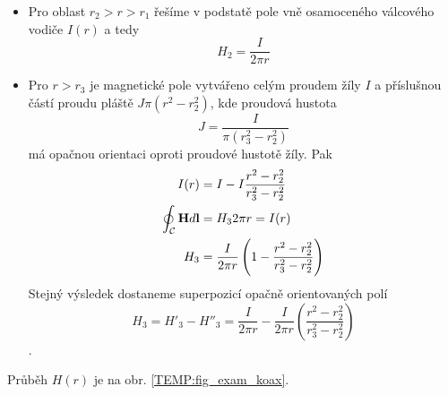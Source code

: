 \begin{example}
\begin{itemize}
    \item Pro oblast $r_2>r>r_1$ řešíme v podstatě pole vně osamoceného válcového vodiče
          $I(r)$ a tedy $$H_2 = \frac{I}{2\pi r}$$
    \item Pro $r>r_3$ je magnetické pole vytvářeno celým proudem žíly $I$ a příslušnou částí
          proudu pláště $J\pi(r^2 - r_2^2)$, kde proudová hustota $$J =
          \frac{I}{\pi(r_3^2-r_2^2)}$$ má opačnou orientaci oproti proudové hustotě žíly. Pak 
          \begin{align*}
            I(r)                           &= I - I\frac{r^2-r_2^2}{r_3^2-r_2^2} \\
            \oint_\mathcal{C}\mathbf{H}d\mathbf{l} &= H_32\pi r = I(r)                   \\          
            H_3                            &= \frac{I}{2\pi r}\left(1 - 
            \frac{r^2 - r_2^2}{r_3^2 - r_2^2}\right) 
          \end{align*}
          Stejný výsledek dostaneme superpozicí opačně orientovaných polí $$H_3 = H'_3 - H''_3 =
          \frac{I}{2\pi r} - \frac{I}{2\pi r}\left(\frac{r^2 - r_2^2}{r_3^2 - r_2^2}\right)$$. 
  \end{itemize}
  Průběh $H(r)$ je na obr. \ref{TEMP:fig_exam_koax}.
\end{example}
